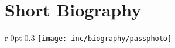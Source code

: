 \documentclass[a4paper,appendixprefix,pdfusetitle,twocolumn,draft,8pt]{scrbook}
\begin{document}
\chapter{Short Biography}
\begin{wrapfigure}[9]{r}[0pt]{0.3\columnwidth}
	\texttt{[image: inc/biography/passphoto]}
\end{wrapfigure}


\begin{comment}
\section*{Personal Details}
\begin{tabular}{ll}
Name:             	& Martin Gwerder\\
Employer address: 	& Untere Parkstrasse 9,5212 Hausen AG, Switzerland\\
Email: 				& martin.gwerder@fhnw.ch\\
\end{tabular}
\section*{Career Summary}
Martin Gwerder started off with an apprenticeship as an electro mecanic. After concluding studies at the polytechnic he worked first as an engineer, later as seniorengineer, and architect for several companies in banking, industry and for the gvernment. 

\section*{Education}
Martin Gwerder is currently a doctoral Student at the University of Basel. After having concluded his studies at the polytechnic at Brugg in 1997, he did a postgraduate study as a master of business and engineering. Following that, he changed to the university track doing an MSc in Informatics at FernUniversit\"at in Hagen.

\section*{Focus}
The main focus of Martin Gwerder are in the fields of data protection, privacy, confidentiality, and anonymity.

\fxfatal{more content to CV}
\end{comment}
\end{document}
